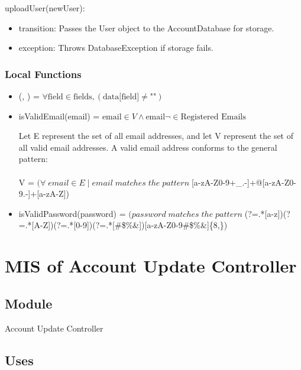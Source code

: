 \documentclass[12pt, titlepage]{article}
\begin{document}
\noindent uploadUser(newUser):
\begin{itemize}
\item transition: Passes the User object to the AccountDatabase for storage.
\item exception: Throws DatabaseException if storage fails.
\end{itemize}

\subsubsection{Local Functions}
\begin{itemize}
    \item 
        (, ) =
        $\forall \text{field} \in \text{fields}, (\text{data[field]} \neq \text{""})$
        
    \item isValidEmail(email) = $\text{email} \in V \land \text{email} \neg \in \text{Registered Emails}$
    
    Let E represent the set of all email addresses, and let V represent the set of all valid email addresses. A valid email address conforms to the general pattern:\\\\
  V = $(\forall\; email \in E\;  |\; email \; matches \; the \; pattern \; $[a-zA-Z0-9+\_.-]+@[a-zA-Z0-9.-]+[a-zA-Z])
  \item isValidPassword(password) = $(password \; matches \; the \; pattern \; $(?=.*[a-z])(?=.*[A-Z])(?=.*[0-9])(?=.*[\#\$\%\&\*\@])[a-zA-Z0-9\#\$\%\&\*\@]\{8,\})\\
  
\end{itemize}

\section{MIS of Account Update Controller} \label{auc}

\subsection{Module}

Account Update Controller

\subsection{Uses}
\end{document}
